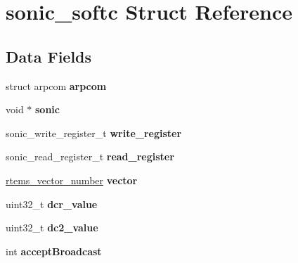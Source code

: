 \hypertarget{structsonic__softc}{}\section{sonic\+\_\+softc Struct Reference}
\label{structsonic__softc}
\subsection*{Data Fields}
\begin{DoxyCompactItemize}
\item 
\mbox{\label{structsonic__softc_a11c628181a8a45d714d49971f6047d6e}} 
struct arpcom {\bfseries arpcom}
\item 
\mbox{\label{structsonic__softc_abdb12025a259595155dad26c13fbb37f}} 
void $\ast$ {\bfseries sonic}
\item 
\mbox{\label{structsonic__softc_ac79b3ff4110fa025a93fe53fc00283ea}} 
sonic\+\_\+write\+\_\+register\+\_\+t {\bfseries write\+\_\+register}
\item 
\mbox{\label{structsonic__softc_acd4fe3ef51f3a0fbef32d182b10d5ca8}} 
sonic\+\_\+read\+\_\+register\+\_\+t {\bfseries read\+\_\+register}
\item 
\mbox{\label{structsonic__softc_a524c2f0c66826dc2c08ee6d4565dff28}} 
\mbox{\hyperlink{group__ClassicINTR_ga3e434c197d99f128e78cae4d9358bd8b}{rtems\+\_\+vector\+\_\+number}} {\bfseries vector}
\item 
\mbox{\label{structsonic__softc_a10b38397c07f3f40ab14144b3a4edf00}} 
uint32\+\_\+t {\bfseries dcr\+\_\+value}
\item 
\mbox{\label{structsonic__softc_a552c288c441d14946e1889fa6be4d439}} 
uint32\+\_\+t {\bfseries dc2\+\_\+value}
\item 
\mbox{\label{structsonic__softc_a65bda7ec67225df68d9b811e3e139980}} 
int {\bfseries accept\+Broadcast}
\item 
\mbox{\label{structsonic__softc_a741b38532885a4e7e625674dfe20eb51}} 

\end{DoxyCompactItemize}

